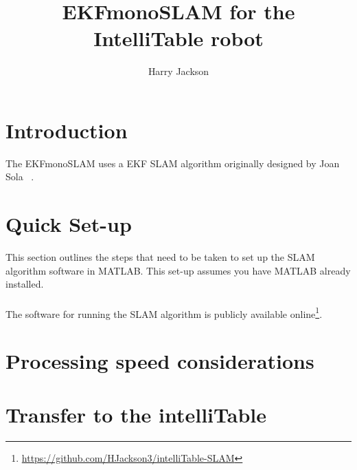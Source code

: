 \documentclass[11pt]{amsart}
\title{EKFmonoSLAM for the IntelliTable robot}
\author{Harry Jackson}
\begin{document}
\maketitle
\section{Introduction}
The EKFmonoSLAM uses a EKF SLAM algorithm originally designed by Joan Sola ~\cite{sola2012impact}.
\section{Quick Set-up}
This section outlines the steps that need to be taken to set up the SLAM algorithm software in MATLAB. This set-up assumes you have MATLAB already installed.
\\\\
The software for running the SLAM algorithm is publicly available online\footnote{\url{https://github.com/HJackson3/intelliTable-SLAM}}.

\section{Processing speed considerations}

\section{Transfer to the intelliTable}


\clearpage
{}

\end{document}
